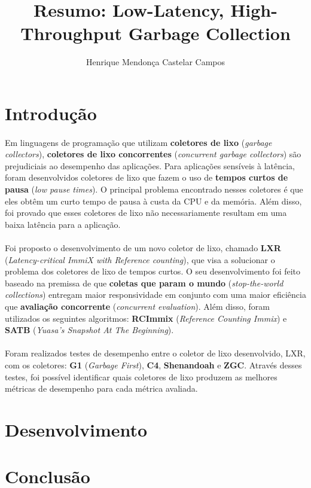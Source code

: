 \documentclass[12pt]{article}
\title{Resumo: Low-Latency, High-Throughput Garbage Collection}
\author{Henrique Mendonça Castelar Campos}
\begin{document}
 

\maketitle

\section{Introdução}

\paragraph{}Em linguagens de programação que utilizam \textbf{coletores de lixo} (\textit{garbage collectors}), \textbf{coletores de lixo concorrentes} (\textit{concurrent garbage collectors}) são prejudiciais ao desempenho das aplicações. Para aplicações sensíveis à latência, foram desenvolvidos coletores de lixo que fazem o uso de \textbf{tempos curtos de pausa} (\textit{low pause times}). O principal problema encontrado nesses coletores é que eles obtêm um curto tempo de pausa à custa da CPU e da memória. Além disso, foi provado que esses coletores de lixo não necessariamente resultam em uma baixa latência para a aplicação.

\paragraph{}Foi proposto o desenvolvimento de um novo coletor de lixo, chamado \textbf{LXR} (\textit{Latency-critical ImmiX with Reference counting}), que visa a solucionar o problema dos coletores de lixo de tempos curtos. O seu desenvolvimento foi feito baseado na premissa de que \textbf{coletas que param o mundo} (\textit{stop-the-world collections}) entregam maior responsividade em conjunto com uma maior eficiência que \textbf{avaliação concorrente} (\textit{concurrent evaluation}). Além disso, foram utilizados os seguintes algoritmos: \textbf{RCImmix} (\textit{Reference Counting Immix}) e \textbf{SATB} (\textit{Yuasa’s Snapshot At The Beginning}).

\paragraph{}Foram realizados testes de desempenho entre o coletor de lixo desenvolvido, LXR, com os coletores: \textbf{G1} (\textit{Garbage First}), \textbf{C4}, \textbf{Shenandoah} e \textbf{ZGC}. Através desses testes, foi possível identificar quais coletores de lixo produzem as melhores métricas de desempenho para cada métrica avaliada.

\section{Desenvolvimento}

\section{Conclusão}




\nocite{10.1145/3519939.3523440}
\end{document}
